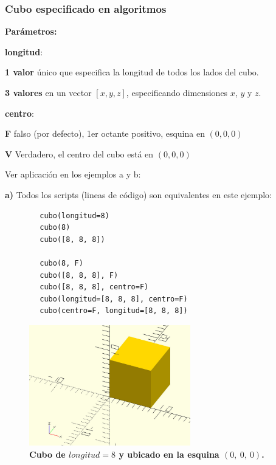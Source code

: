 \subsubsection{Cubo especificado en algoritmos}
\begin{description}
\item  \textbf{Parámetros:}
\item   \textbf{longitud}:
\begin{description}
\item \textbf{1 valor} único que especifica la longitud de todos los lados del cubo.
\item \textbf{3 valores} en un vector $[x,y,z]$, especificando dimensiones $x$, $y$ y $z$.
\end{description}
\item   \textbf{centro}:
\begin{description}
\item \textbf{F} falso (por defecto), 1er octante positivo, esquina en $(0, 0, 0)$
\item \textbf{V} Verdadero, el centro del cubo está en $(0, 0, 0)$
\end{description}
\end{description}

Ver aplicación en los ejemplos a y b:

\textbf{a)} Todos los scripts (lineas de código) son equivalentes en este ejemplo: \begin{listing}[ht]
\begin{verbatim}
        cubo(longitud=8)
        cubo(8)
        cubo([8, 8, 8])
         
        cubo(8, F)
        cubo([8, 8, 8], F)
        cubo([8, 8, 8], centro=F)
        cubo(longitud=[8, 8, 8], centro=F)
        cubo(centro=F, longitud=[8, 8, 8])
\end{verbatim}
\end{listing}

\begin{figure}[h]
\includegraphics[width=7cm]{Img/Modelos/modelado1.jpg}
\centering
\caption{\textbf{\footnotesize{Cubo de $longitud = 8$ y ubicado en la esquina $(0,\ 0, \ 0)$. }}}
\end{figure}


